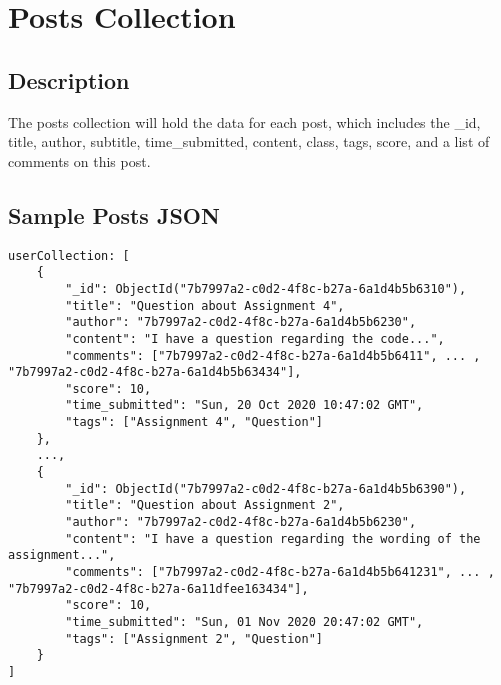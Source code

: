 \documentclass[preprint,11pt,3p]{article}
\begin{document}
\newpage

\section{Posts Collection}

\subsection{Description}
	The posts collection will hold the data for each post, which includes the _id, title, author, subtitle, time_submitted, content, class, tags, score, and a list of comments on this post.

\subsection{Sample Posts JSON}
\begin{lstlisting}
userCollection: [
	{
		"_id": ObjectId("7b7997a2-c0d2-4f8c-b27a-6a1d4b5b6310"),
		"title": "Question about Assignment 4",
		"author": "7b7997a2-c0d2-4f8c-b27a-6a1d4b5b6230",
		"content": "I have a question regarding the code...",
		"comments": ["7b7997a2-c0d2-4f8c-b27a-6a1d4b5b6411", ... , "7b7997a2-c0d2-4f8c-b27a-6a1d4b5b63434"],
		"score": 10,
		"time_submitted": "Sun, 20 Oct 2020 10:47:02 GMT",
		"tags": ["Assignment 4", "Question"]
	},
	...,
	{
		"_id": ObjectId("7b7997a2-c0d2-4f8c-b27a-6a1d4b5b6390"),
		"title": "Question about Assignment 2",
		"author": "7b7997a2-c0d2-4f8c-b27a-6a1d4b5b6230",
		"content": "I have a question regarding the wording of the assignment...",
		"comments": ["7b7997a2-c0d2-4f8c-b27a-6a1d4b5b641231", ... , "7b7997a2-c0d2-4f8c-b27a-6a11dfee163434"],
		"score": 10,
		"time_submitted": "Sun, 01 Nov 2020 20:47:02 GMT",
		"tags": ["Assignment 2", "Question"]
	}
]
\end{lstlisting}
\end{document}
